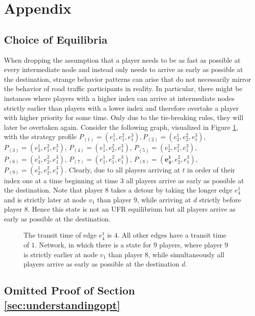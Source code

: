 \newpage
\appendix
\section{Appendix}\label{app}
\subsection{Choice of Equilibria}\label{sec:equi}
When dropping the assumption that a player needs to be as fast as possible at every intermediate node and instead only needs to arrive as early as possible at the destination, strange behavior patterns can arise that do not necessarily mirror the behavior of road traffic participants in reality. In particular, there might be instances where players with a higher index can arrive at intermediate nodes strictly earlier than players with a lower index and therefore overtake a player with higher priority for some time. Only due to the tie-breaking rules, they will later be overtaken again.  
Consider the following graph, visualized in Figure \ref{fig:overtakingInNE}, with the strategy profile
$P_{(1)}=(e_1^1,e_1^2,e_1^3), P_{(2)}=(e_2^1,e_2^2,e_1^3)$, $P_{(3)}=(e_3^1,e_1^2,e_1^3)$, $P_{(4)}=(e_1^1,e_2^2,e_1^3)$, $P_{(5)}=(e_2^1,e_1^2,e_1^3)$, $P_{(6)}=(e_3^1,e_2^2,e_1^3)$, $P_{(7)}=(e_1^1,e_1^2,e_1^3)$, \mbox{$P_{(8)}=(\mathbf{e_4^1},e_2^2,e_1^3)$}, $P_{(9)}=(e_2^1,e_2^2,e_1^3)$.
Clearly, due to all players arriving at $t$ in order of their index one at a time beginning at time $3$ all players arrive as early as possible at the destination. Note that player 8 takes a detour by taking the longer edge $e_4^1$ and is strictly later at node $v_1$ than player 9, while arriving at $d$ strictly before player $8$. Hence this state is not an UFR equilibrium but all players arrive as early as possible at the destination.
\begin{figure}[h]
    \centering
    
    \caption{The transit time of edge $e_4^1$ is $4$. All other edges have a transit time of $1$. Network, in which there is a state for $9$ players, where player 9 is strictly earlier at node $v_1$ than player 8, while simultaneously all players arrive as early as possible at the destination $d$.}
    \label{fig:overtakingInNE}
\end{figure}
\subsection{Omitted Proof of Section \ref{sec:understandingopt}}\label{app:understandingopt}

